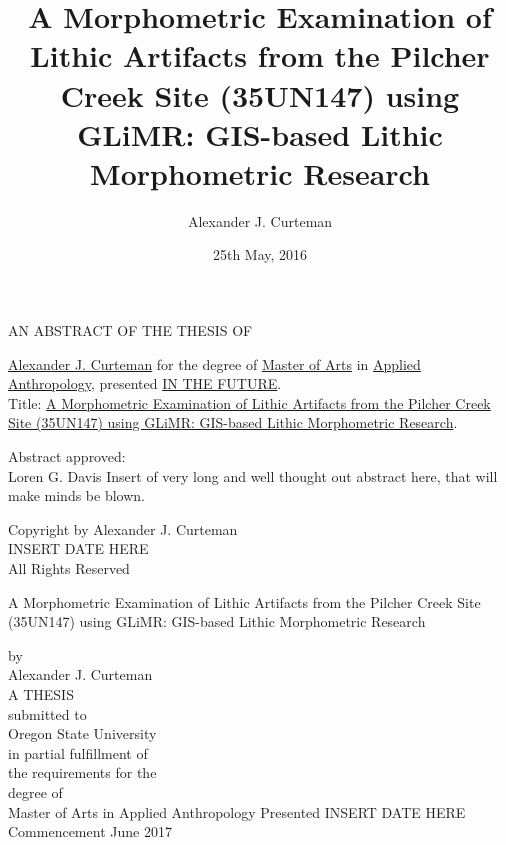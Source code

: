 \documentclass[12pt,letterpaper,oneside]{book}
\author{Alexander J. Curteman}
\title{A Morphometric Examination of Lithic Artifacts from the Pilcher Creek Site (35UN147) using GLiMR: GIS-based Lithic Morphometric Research}
\date{25th May, 2016}
\newcommand{\flyleaf}{\thispagestyle{empty}\phantom{}\newpage}
\newcommand{\emptyline}{\mbox{}\newline}
\begin{document}
\frontmatter
{}

\flyleaf

\begin{center}
AN ABSTRACT OF THE THESIS OF
\end{center}
\begin{flushleft}
\noindent
\ul{Alexander J. Curteman} for the degree of \ul{Master of Arts} in \ul{Applied Anthropology},  presented \ul{IN THE FUTURE}.\\
\emptyline
\noindent Title: \ul{A Morphometric Examination of Lithic Artifacts from the Pilcher Creek Site (35UN147) using GLiMR: GIS-based Lithic Morphometric Research}.\par\vskip1cm
\end{flushleft}
\emptyline
Abstract approved: \hrulefill \\
\phantom{Abstract approved:\ }Loren G. Davis
\vspace{1em}
\noindent
\emptyline
\emptyline
Insert of very long and well thought out abstract here, that will make minds be blown.
\clearpage

\begin{singlespace}
\thispagestyle{empty}
\vspace*{10\baselineskip}
\begin{center}
\textcopyright Copyright by Alexander J. Curteman\\
INSERT DATE HERE\\
All Rights Reserved
\end{center}
\end{singlespace}
\clearpage

\thispagestyle{empty}
\begin{center}
\setlength{\baselineskip}{14.5pt}
\begin{singlespace}
A Morphometric Examination of Lithic Artifacts from the Pilcher Creek Site (35UN147) using GLiMR: GIS-based Lithic Morphometric Research \\
\end{singlespace}
\emptyline by\\ \emptyline
Alexander J. Curteman\\
\vfill
A THESIS\\ \emptyline
submitted to\\ \emptyline
Oregon State University\\
\vfill
in partial fulfillment of\\
the requirements for the\\
degree of\\ \emptyline
Master of Arts in Applied Anthropology
\vfill
Presented INSERT DATE HERE\\
Commencement June 2017
\end{center}
\clearpage
\end{document}
